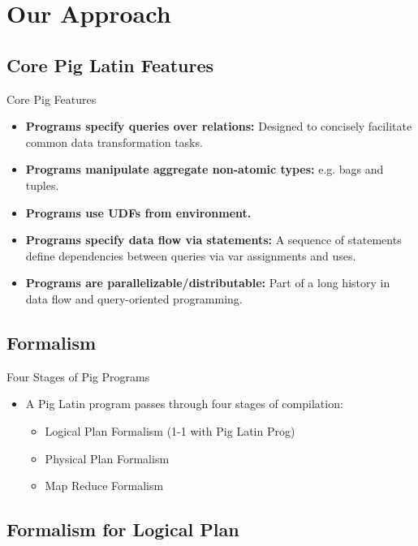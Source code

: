 \section{Our Approach}

\subsection{Core Pig Latin Features}
\begin{frame}{Core Pig Features}
\begin{itemize}
	\item \textbf{Programs specify queries over relations:} Designed to
	concisely facilitate common data transformation tasks.
	\item \textbf{Programs manipulate aggregate non-atomic types:} e.g. bags
	and tuples.
	\item \textbf{Programs use UDFs from environment.}
	\item \textbf{Programs specify data flow via statements:} A sequence of
	statements define dependencies between queries via var assignments and uses.
	\item \textbf{Programs are parallelizable/distributable:} Part of a long
	history in data flow and query-oriented programming.
\end{itemize}
\end{frame}

\subsection{Formalism}
\begin{frame}{Four Stages of Pig Programs}
\begin{itemize}
	\item A Pig Latin program passes through four stages of compilation:
	\begin{itemize}
		\item Logical Plan Formalism (1-1 with Pig Latin Prog)
		\item Physical Plan Formalism
		\item Map Reduce Formalism
	\end{itemize}
\end{itemize}
\end{frame}

\subsection{Formalism for Logical Plan}


